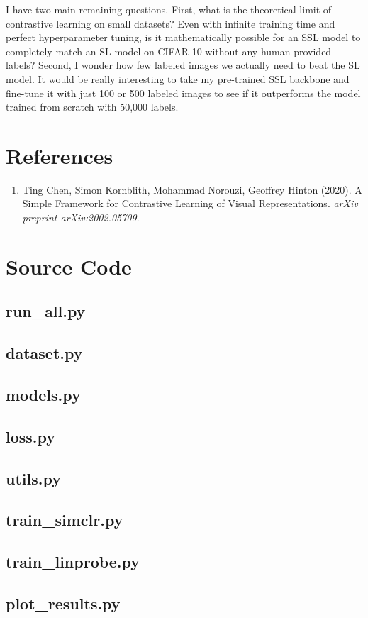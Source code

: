 \documentclass[12pt]{article}
\begin{document}
I have two main remaining questions. First, what is the theoretical limit of contrastive learning on small datasets? Even with infinite training time and perfect hyperparameter tuning, is it mathematically possible for an SSL model to completely match an SL model on CIFAR-10 without any human-provided labels? Second, I wonder how few labeled images we actually need to beat the SL model. It would be really interesting to take my pre-trained SSL backbone and fine-tune it with just 100 or 500 labeled images to see if it outperforms the model trained from scratch with 50,000 labels.

\section{References}
\begin{enumerate}
    \item Ting Chen, Simon Kornblith, Mohammad Norouzi, Geoffrey Hinton (2020). A Simple Framework for Contrastive Learning of Visual Representations. \textit{arXiv preprint arXiv:2002.05709}.
\end{enumerate}

\newpage
\appendix
\section{Source Code}
\subsection{run\_all.py}


\subsection{dataset.py}


\subsection{models.py}


\subsection{loss.py}


\subsection{utils.py}


\subsection{train\_simclr.py}


\subsection{train\_linprobe.py}


\subsection{plot\_results.py}

\end{document}
